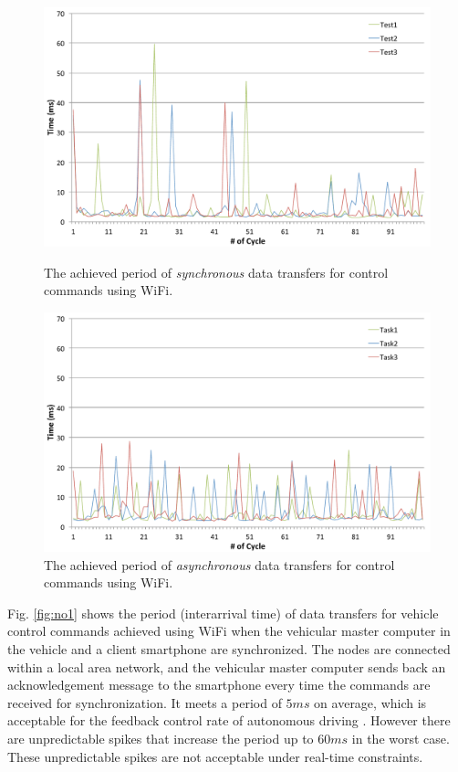\begin{figure}[!t]
 \centering
 \includegraphics[width=0.8\hsize]{fig/No1_Andrive_serv_cycle_WiFi.pdf}
 \caption{The achieved period of \textit{synchronous} data transfers for
 control commands using WiFi.}
 \label{fig:no1}
 \vspace{1em}
 \includegraphics[width=0.8\hsize]{fig/No4_Andrive_serv_cycle_WiFi_only_send.pdf}
 \caption{The achieved period of \textit{asynchronous} data transfers
 for control commands using WiFi.}
 \label{fig:no4}
\end{figure}

Fig. \ref{fig:no1} shows the period (interarrival time) of data
transfers for vehicle control commands achieved using WiFi when the
vehicular master computer in the vehicle and a client smartphone are
synchronized.
The nodes are connected within a local area network, and the vehicular
master computer sends back an acknowledgement message to the smartphone
every time the commands are received for synchronization.
It meets a period of $5ms$ on average, which is acceptable for the
feedback control rate of autonomous driving \cite{Kagami13}.
However there are unpredictable spikes that increase the period up to
$60ms$ in the worst case.
These unpredictable spikes are not acceptable under real-time
constraints.

